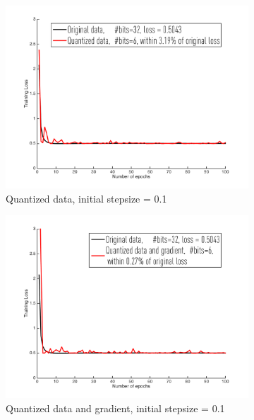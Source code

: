 \documentclass{article}
\begin{document}
\begin{figure}[h]
\centering
    \begin{subfigure}[h]{.3\columnwidth}
    \includegraphics[width=\columnwidth]{lr/synthetic/20hard/d01}
    \caption{Quantized data, initial stepsize = 0.1}
    \end{subfigure}
    \begin{subfigure}[h]{.3\columnwidth}
    \includegraphics[width=\columnwidth]{lr/synthetic/20hard/dg01}
    \caption{Quantized data and gradient, initial stepsize = 0.1}
    \end{subfigure}
    \begin{subfigure}[h]{.3\columnwidth}

\end{subfigure}
\end{figure}
\end{document}
